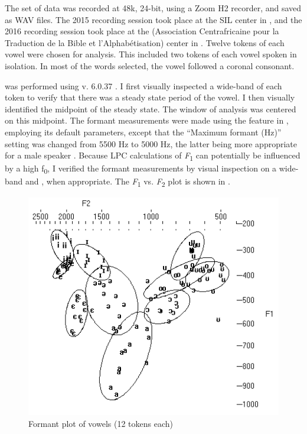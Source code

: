 \documentclass[output=paper,colorlinks,citecolor=brown]{langscibook}
\begin{document}
The set of data was recorded at 48k, 24-bit, using a Zoom H2 recorder, and saved as WAV files. The 2015 recording session took place at the SIL center in , and the 2016 recording session took place at the  (Association Centrafricaine pour la Traduction de la Bible et l’Alphabétisation) center in . Twelve tokens of each vowel were chosen for analysis. This included two tokens of each vowel spoken in isolation. In most of the words selected, the vowel followed a coronal consonant.

 was performed using  v. 6.0.37 \citep{BoersmaWeenink2018}. I first visually inspected a wide-band  of each token to verify that there was a steady state period of the vowel. I then visually identified the midpoint of the steady state. The window of analysis was centered on this midpoint. The formant measurements were made using the  feature in , employing its default parameters, except that the “Maximum formant (Hz)” setting was changed from 5500 Hz to 5000 Hz, the latter being more appropriate for a male speaker \citep{BoersmaWeenink2018}. Because LPC calculations of \textit{F}\textsubscript{1} can potentially be influenced by a high ƒ\textsubscript{0}, I verified the formant measurements by visual inspection on a wide-band  and , when appropriate. The \textit{F}\textsubscript{1} vs. \textit{F}\textsubscript{2} plot is shown in .

\begin{figure}
    \includegraphics[height=.3\textheight]{figures/OlsonFig1.png}
    \caption{Formant plot of  vowels (12 tokens each)}
    \label{fig:olson:1}
\end{figure}
\end{document}
